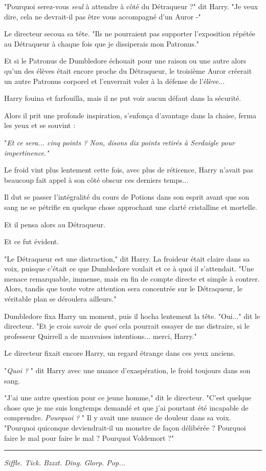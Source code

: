 "Pourquoi serez-vous \emph{seul } à attendre à côté du Détraqueur ?" dit Harry. "Je veux dire, cela ne devrait-il pas être vous accompagné d'un Auror -"

Le directeur secoua sa tête. "Ils ne pourraient pas supporter l'exposition répétée au Détraqueur à chaque fois que je dissiperais mon Patronus."

Et si le Patronus de Dumbledore échouait pour une raison ou une autre alors qu'un des élèves était encore proche du Détraqueur, le troisième Auror créerait un autre Patronus corporel et l'enverrait voler à la défense de l'élève...

Harry fouina et farfouilla, mais il ne put voir aucun défaut dans la sécurité.

Alors il prit une profonde inspiration, s'enfonça d'avantage dans la chaise, ferma les yeux et se souvint :

"\emph{Et ce sera... cinq points ? Non, disons dix points retirés à Serdaigle pour impertinence."} 

Le froid vint plus lentement cette fois, avec plus de réticence, Harry n'avait pas beaucoup fait appel à son côté obscur ces derniers temps...

Il dut se passer l'intégralité du cours de Potions dans son esprit avant que son sang ne se pétrifie en quelque chose approchant une clarté cristalline et mortelle.

Et il pensa alors au Détraqueur.

Et ce fut évident.

"Le Détraqueur est une distraction," dit Harry. La froideur était claire dans sa voix, puisque c'était ce que Dumbledore voulait et ce à quoi il s'attendait. "Une menace remarquable, immense, mais en fin de compte directe et simple à contrer. Alors, tandis que toute votre attention sera concentrée sur le Détraqueur, le véritable plan se déroulera ailleurs."

Dumbledore fixa Harry un moment, puis il hocha lentement la tête. "Oui..." dit le directeur. "Et je crois savoir de \emph{quoi}  cela pourrait essayer de me distraire, si le professeur Quirrell a de mauvaises intentions... merci, Harry."

Le directeur fixait encore Harry, un regard étrange dans ces yeux anciens.

"\emph{Quoi ?} " dit Harry avec une nuance d'exaspération, le froid toujours dans son sang.

"J'ai une autre question pour ce jeune homme," dit le directeur. "C'est quelque chose que je me suis longtemps demandé et que j'ai pourtant été incapable de comprendre. \emph{Pourquoi ?} " Il y avait une nuance de douleur dans sa voix. "Pourquoi quiconque deviendrait-il un monstre de façon délibérée ? Pourquoi faire le mal pour faire le mal ? Pourquoi Voldemort ?"
\par\noindent\rule{\textwidth}{0.4pt}
\emph{Siffle. Tick. Bzzzt. Ding. Glorp. Pop...} 

